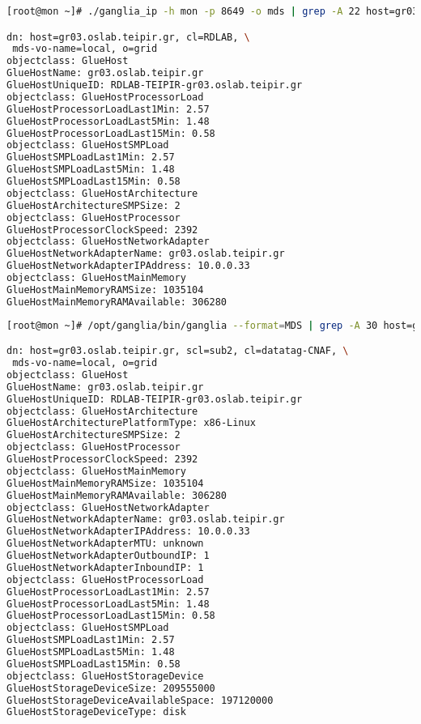 \begin{lstlisting}[language=bash,caption=Perl Ganglia Information Provider for MDS,label=perlbdii]
[root@mon ~]# ./ganglia_ip -h mon -p 8649 -o mds | grep -A 22 host=gr03

dn: host=gr03.oslab.teipir.gr, cl=RDLAB, \
 mds-vo-name=local, o=grid
objectclass: GlueHost
GlueHostName: gr03.oslab.teipir.gr
GlueHostUniqueID: RDLAB-TEIPIR-gr03.oslab.teipir.gr
objectclass: GlueHostProcessorLoad
GlueHostProcessorLoadLast1Min: 2.57
GlueHostProcessorLoadLast5Min: 1.48
GlueHostProcessorLoadLast15Min: 0.58
objectclass: GlueHostSMPLoad
GlueHostSMPLoadLast1Min: 2.57
GlueHostSMPLoadLast5Min: 1.48
GlueHostSMPLoadLast15Min: 0.58
objectclass: GlueHostArchitecture
GlueHostArchitectureSMPSize: 2
objectclass: GlueHostProcessor
GlueHostProcessorClockSpeed: 2392
objectclass: GlueHostNetworkAdapter
GlueHostNetworkAdapterName: gr03.oslab.teipir.gr
GlueHostNetworkAdapterIPAddress: 10.0.0.33
objectclass: GlueHostMainMemory
GlueHostMainMemoryRAMSize: 1035104
GlueHostMainMemoryRAMAvailable: 306280
\end{lstlisting}

\begin{lstlisting}[language=bash,caption=Python Ganglia client MDS export,label=pythonbdii]
[root@mon ~]# /opt/ganglia/bin/ganglia --format=MDS | grep -A 30 host=gr03

dn: host=gr03.oslab.teipir.gr, scl=sub2, cl=datatag-CNAF, \
 mds-vo-name=local, o=grid
objectclass: GlueHost
GlueHostName: gr03.oslab.teipir.gr
GlueHostUniqueID: RDLAB-TEIPIR-gr03.oslab.teipir.gr
objectclass: GlueHostArchitecture
GlueHostArchitecturePlatformType: x86-Linux
GlueHostArchitectureSMPSize: 2
objectclass: GlueHostProcessor
GlueHostProcessorClockSpeed: 2392
objectclass: GlueHostMainMemory
GlueHostMainMemoryRAMSize: 1035104
GlueHostMainMemoryRAMAvailable: 306280
objectclass: GlueHostNetworkAdapter
GlueHostNetworkAdapterName: gr03.oslab.teipir.gr
GlueHostNetworkAdapterIPAddress: 10.0.0.33
GlueHostNetworkAdapterMTU: unknown
GlueHostNetworkAdapterOutboundIP: 1
GlueHostNetworkAdapterInboundIP: 1
objectclass: GlueHostProcessorLoad
GlueHostProcessorLoadLast1Min: 2.57
GlueHostProcessorLoadLast5Min: 1.48
GlueHostProcessorLoadLast15Min: 0.58
objectclass: GlueHostSMPLoad
GlueHostSMPLoadLast1Min: 2.57
GlueHostSMPLoadLast5Min: 1.48
GlueHostSMPLoadLast15Min: 0.58
objectclass: GlueHostStorageDevice
GlueHostStorageDeviceSize: 209555000
GlueHostStorageDeviceAvailableSpace: 197120000
GlueHostStorageDeviceType: disk
\end{lstlisting}

